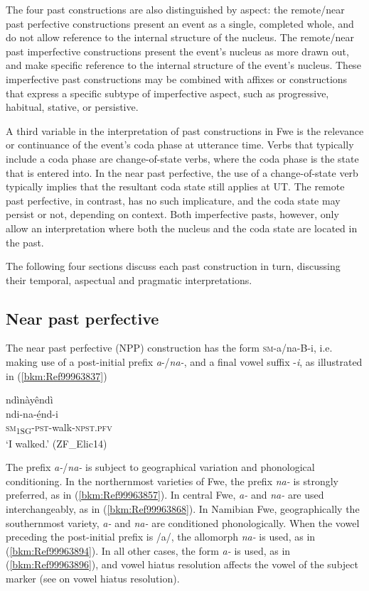 The four past constructions are also distinguished by aspect: the remote{\slash}near past perfective constructions present an event as a single, completed whole, and do not allow reference to the internal structure of the nucleus. The remote/near past imperfective constructions present the event’s nucleus as more drawn out, and make specific reference to the internal structure of the event’s nucleus. These imperfective past constructions may be combined with affixes or constructions that express a specific subtype of imperfective aspect, such as progressive, habitual, stative, or persistive.

A third variable in the interpretation of past constructions in Fwe is the relevance or continuance of the event’s coda phase at utterance time. Verbs that typically include a coda phase are change-of-state verbs, where the coda phase is the state that is entered into. In the near past perfective, the use of a change-of-state verb typically implies that the resultant coda state still applies at UT. The remote past perfective, in contrast, has no such implicature, and the coda state may persist or not, depending on context. Both imperfective pasts, however, only allow an interpretation where both the nucleus and the coda state are located in the past.

The following four sections discuss each past construction in turn, discussing their temporal, aspectual and pragmatic interpretations.

\subsection{Near past perfective}
\label{bkm:Ref488767483}\hypertarget{Toc75352681}{}\label{bkm:Ref488767759}\label{bkm:Ref488767671}
The near past perfective (NPP) construction has the form \textsc{sm}-a/na-B-i, i.e. making use of a post-initial prefix \textit{a}-/\textit{na-}, and a final vowel suffix -\textit{i}, as illustrated in (\ref{bkm:Ref99963837})

\ea
\label{bkm:Ref99963837}
\glll ndìnàyêndì\\
ndi-na-é̲nd-i\\
\textsc{sm}\textsubscript{1SG}-\textsc{pst}-walk-\textsc{npst}.\textsc{pfv}\\
\glt ‘I walked.’ (ZF\_Elic14)
\z

The prefix \textit{a-}/\textit{na-} is subject to geographical variation and phonological conditioning. In the northernmost varieties of Fwe, the prefix \textit{na-} is strongly preferred, as in (\ref{bkm:Ref99963857}). In central Fwe, \textit{a-} and \textit{na-} are used interchangeably, as in (\ref{bkm:Ref99963868}). In Namibian Fwe, geographically the southernmost variety, \textit{a-} and \textit{na-} are conditioned phonologically. When the vowel preceding the post-initial prefix is /a/, the allomorph \textit{na-} is used, as in (\ref{bkm:Ref99963894}). In all other cases, the form \textit{a-} is used, as in (\ref{bkm:Ref99963896}), and vowel hiatus resolution affects the vowel of the subject marker (see  on vowel hiatus resolution).

